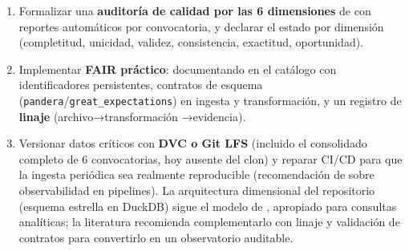 \begin{enumerate}
  \item Formalizar una \textbf{auditoría de calidad por las 6 dimensiones} de
        \citet{wang1996beyond} con reportes automáticos por convocatoria, y
        declarar el estado por dimensión (completitud, unicidad, validez,
        consistencia, exactitud, oportunidad).
  \item Implementar \textbf{FAIR práctico}: documentando en el catálogo con
        identificadores persistentes, contratos de esquema
        (\texttt{pandera}/\texttt{great\_expectations}) en ingesta y
        transformación, y un registro de \textbf{linaje} (archivo→transformación
        →evidencia).
  \item Versionar datos críticos con \textbf{DVC o Git LFS} (incluido el
        consolidado completo de 6 convocatorias, hoy ausente del clon) y
        reparar CI/CD para que la ingesta periódica sea realmente reproducible
        (recomendación de \citep{souza2023observability} sobre observabilidad
        en pipelines). La arquitectura dimensional del repositorio (esquema
        estrella en DuckDB) sigue el modelo de \citet{kimball2013data},
        apropiado para consultas analíticas; la literatura recomienda
        complementarlo con linaje y validación de contratos para convertirlo en
        un observatorio auditable.
\end{enumerate}
